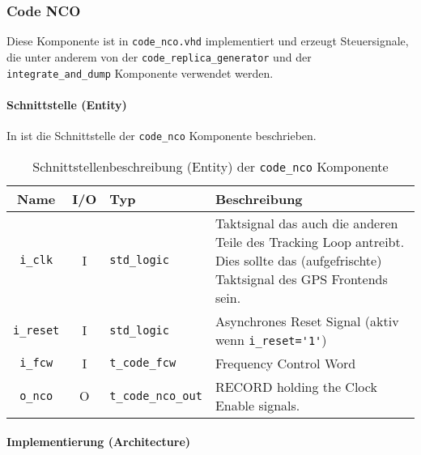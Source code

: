 \subsubsection{Code NCO}
Diese Komponente ist in  \lstinline$code_nco.vhd$ implementiert und erzeugt Steuersignale, die unter anderem von der \lstinline$code_replica_generator$ und der \lstinline$integrate_and_dump$ Komponente verwendet werden.



\paragraph{Schnittstelle (Entity)}
In  ist die Schnittstelle der \lstinline$code_nco$ Komponente beschrieben.

\begin{table}[htbp]
    \ttabbox
    {
        \caption[Code NCO Schnittstelle]{Schnittstellenbeschreibung (Entity) der \lstinline$code_nco$ Komponente}
        \label{TabCodeNCO_Entity}
    }
    {
    \begin{tabular}{c c  p{2cm} p{6cm}}
        \toprule
        Name                    & I/O  & Typ                               & Beschreibung \\
        \midrule
        \lstinline$i_clk$       & I         & \lstinline$std_logic$             & Taktsignal das auch die anderen Teile des Tracking Loop antreibt. Dies sollte das (aufgefrischte) Taktsignal des GPS Frontends sein.\\
        \lstinline$i_reset$     & I         & \lstinline$std_logic$             & Asynchrones Reset Signal (aktiv wenn \lstinline$i_reset='1'$) \\
        \lstinline$i_fcw$    & I         & \lstinline$t_code_fcw$             & Frequency Control Word \\
        \lstinline$o_nco$       & O         & \lstinline$t_code_nco_out$ & RECORD holding the Clock Enable signals. \\
        \bottomrule
    \end{tabular}
}
\end{table}

\paragraph{Implementierung (Architecture)}

